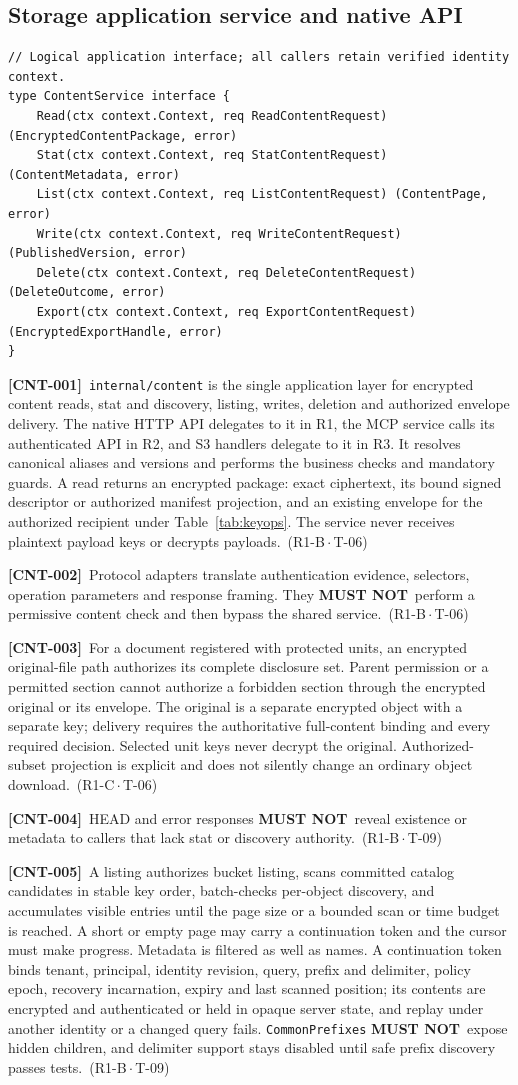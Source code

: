 \documentclass[11pt,a4paper]{article}
\newcommand{\mustnot}{\textbf{MUST NOT}}
\newcommand{\code}[1]{{\small\nolinkurl{#1}}}
\newcommand{\reqtag}[2]{{\footnotesize\color{accent}(#1\,$\cdot$\,#2)}}
\newcommand{\req}[4]{\par\noindent\hypertarget{req:#1}{\textbf{[#1]}}\ #4\ \reqtag{#2}{#3}\par}
\begin{document}
\subsection{Storage application service and native API}
\begin{lstlisting}
// Logical application interface; all callers retain verified identity context.
type ContentService interface {
    Read(ctx context.Context, req ReadContentRequest) (EncryptedContentPackage, error)
    Stat(ctx context.Context, req StatContentRequest) (ContentMetadata, error)
    List(ctx context.Context, req ListContentRequest) (ContentPage, error)
    Write(ctx context.Context, req WriteContentRequest) (PublishedVersion, error)
    Delete(ctx context.Context, req DeleteContentRequest) (DeleteOutcome, error)
    Export(ctx context.Context, req ExportContentRequest) (EncryptedExportHandle, error)
}
\end{lstlisting}
\req{CNT-001}{R1-B}{T-06}{\code{internal/content} is the single application layer for encrypted content reads, stat and discovery, listing, writes, deletion and authorized envelope delivery. The native HTTP API delegates to it in R1, the MCP service calls its authenticated API in R2, and S3 handlers delegate to it in R3. It resolves canonical aliases and versions and performs the business checks and mandatory guards. A read returns an encrypted package: exact ciphertext, its bound signed descriptor or authorized manifest projection, and an existing envelope for the authorized recipient under Table~\ref{tab:keyops}. The service never receives plaintext payload keys or decrypts payloads.}
\req{CNT-002}{R1-B}{T-06}{Protocol adapters translate authentication evidence, selectors, operation parameters and response framing. They \mustnot\ perform a permissive content check and then bypass the shared service.}
\req{CNT-003}{R1-C}{T-06}{For a document registered with protected units, an encrypted original-file path authorizes its complete disclosure set. Parent permission or a permitted section cannot authorize a forbidden section through the encrypted original or its envelope. The original is a separate encrypted object with a separate key; delivery requires the authoritative full-content binding and every required decision. Selected unit keys never decrypt the original. Authorized-subset projection is explicit and does not silently change an ordinary object download.}
\req{CNT-004}{R1-B}{T-09}{HEAD and error responses \mustnot\ reveal existence or metadata to callers that lack stat or discovery authority.}
\req{CNT-005}{R1-B}{T-09}{A listing authorizes bucket listing, scans committed catalog candidates in stable key order, batch-checks per-object discovery, and accumulates visible entries until the page size or a bounded scan or time budget is reached. A short or empty page may carry a continuation token and the cursor must make progress. Metadata is filtered as well as names. A continuation token binds tenant, principal, identity revision, query, prefix and delimiter, policy epoch, recovery incarnation, expiry and last scanned position; its contents are encrypted and authenticated or held in opaque server state, and replay under another identity or a changed query fails. \code{CommonPrefixes} \mustnot\ expose hidden children, and delimiter support stays disabled until safe prefix discovery passes tests.}
\end{document}
